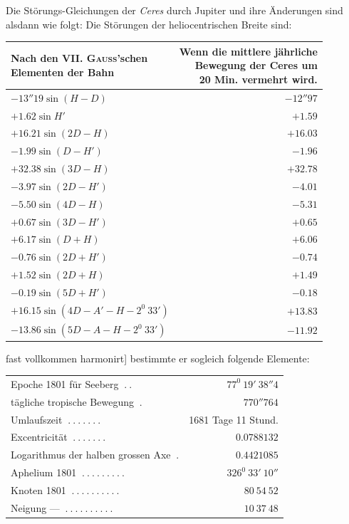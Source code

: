 Die Störungs-Gleichungen der \textit{Ceres} durch Jupiter und ihre Änderungen sind alsdann wie folgt:
%
Die Störungen der heliocentrischen Breite sind:
\begin{center}
\begingroup\small
\begin{tabular}{l|r}
\shortstack{Nach den VII. \textsc{Gauss}'schen\\Elementen der Bahn}&\shortstack{Wenn die mittlere jährliche\\Bewegung der Ceres um\\20 Min. vermehrt wird.}\\\hline
$-13''19\sin(H-D)$&$-12''97$\\
$+1.62\sin H'$&$+1.59$\\[3pt]
$+16.21\sin(2D-H)$&$+16.03$\\
$-1.99\sin(D-H')$&$-1.96$\\[3pt]
$+32.38\sin(3D-H)$&$+32.78$\\
$-3.97\sin(2D-H')$&$-4.01$\\[3pt]
$-5.50\sin(4D-H)$&$-5.31$\\
$+0.67\sin(3D-H')$&$+0.65$\\[3pt]
$+6.17\sin(D+H)$&$+6.06$\\
$-0.76\sin(2D+H')$&$-0.74$\\[3pt]
$+1.52\sin(2D+H)$&$+1.49$\\
$-0.19\sin(5D+H')$&$-0.18$\\[3pt]
$+16.15\sin(4D-A'-H-2^0\ 33')$&$+13.83$\\
$-13.86\sin(5D-A-H-2^0\ 33')$&$-11.92$
\end{tabular}\endgroup
\end{center}
fast vollkommen harmonirt] bestimmte er sogleich folgende Elemente:
\begin{center}
\begingroup\small\setlength{\tabcolsep}{3pt}
\begin{tabular}{l r}
Epoche 1801 für Seeberg $\ .\ .$&$77^0\ 19'\ 38''4$\\
tägliche tropische Bewegung $\ .$&$770''764$\\
Umlaufszeit $\ .\ .\ .\ .\ .\ .\ .$&1681 Tage 11 Stund.\\
Excentricität $\ .\ .\ .\ .\ .\ .\ .$&$0.0788132$\\[3pt]
Logarithmus der halben grossen Axe $\ .$&$0.4421085$\\
Aphelium 1801 $\ .\ .\ .\ .\ .\ .\ .\ .\ .$&$326^0\ 33'\ 10''$\\
Knoten 1801 $\ .\ .\ .\ .\ .\ .\ .\ .\ .\ .$&$80\ 54\ 52$\\
Neigung — $\ .\ .\ .\ .\ .\ .\ .\ .\ .\ .$&$10\ 37\ 48$
\end{tabular}\endgroup
\end{center}

